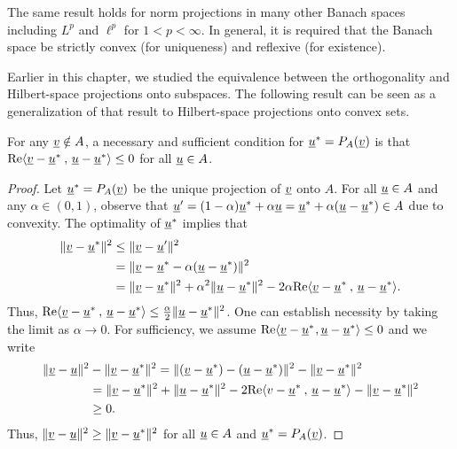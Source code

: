 \begin{remark}
The same result holds for norm projections in many other Banach spaces including $L^{p}$ and $\ell^{p}$ for $1<p<\infty$. In general, it is required that the Banach space be strictly convex (for uniqueness) and reflexive (for existence).
\end{remark}



Earlier in this chapter, we studied the equivalence between the orthogonality and Hilbert-space projections onto subspaces.
The following result can be seen as a generalization of that result to Hilbert-space projections onto convex sets.

\begin{theorem}
\label{theorem:convex_proj_lt0}
For any $\underline{v} \notin A$, a necessary and sufficient condition for $\underline{u}^* = P_A (\underline{v})$ is that $\mathrm{Re} {\langle  \underline{v}-\underline{u}^* \, \mskip1mu , \, \underline{u}-\underline{u}^*  \rangle} \leq 0$ for all $\underline{u}\in A$.
\end{theorem}
\begin{proof}
Let $\underline{u}^* = P_A (\underline{v})$ be the unique projection of $\underline{v}$ onto $A$.
For all $\underline{u} \in A$ %
and any $\alpha\in (0,1)$, observe that $\underline{u}'=(1-\alpha) \underline{u}^* + \alpha \underline{u} = \underline{u}^* + \alpha (\underline{u}-\underline{u}^*)\in A$ due to convexity.
The optimality of $\underline{u}^*$ implies that
\begin{align*}
\| \underline{v}-\underline{u}^* \|^2
&\leq \| \underline{v}- \underline{u}' \|^2 \\
&= \| \underline{v}- \underline{u}^* - \alpha (\underline{u}-\underline{u}^*) \|^2 \\
&= \| \underline{v} - \underline{u}^* \|^2 + \alpha^2 \| \underline{u} - \underline{u}^* \|^2 - 2 \alpha \mathrm{Re} {\langle  \underline{v}-\underline{u}^* \, \mskip1mu , \, \underline{u}-\underline{u}^*  \rangle}. 
\end{align*}
Thus, $\mathrm{Re} {\langle  \underline{v}-\underline{u}^* \, \mskip1mu , \, \underline{u}-\underline{u}^*  \rangle} \leq \frac{\alpha}{2} \| \underline{u} - \underline{u}^* \|^2$.
One can establish necessity by taking the limit as $\alpha \to 0$.
For sufficiency, we assume $\mathrm{Re} {\langle  \underline{v}-\underline{u}^*  \mskip1mu ,  \underline{u}-\underline{u}^*  \rangle} \leq 0$ and we write
\begin{align*}
\| \underline{v}-\underline{u} \|^2 &- \| \underline{v} - \underline{u}^* \|^2
= \| (\underline{v} - \underline{u}^*) - (\underline{u} - \underline{u}^*) \|^2 - \|\underline{v} - \underline{u}^* \|^2 \\
&= \| \underline{v}-\underline{u}^* \|^2 + \| \underline{u} -\underline{u}^* \| ^2 - 2 \mathrm{Re} {\langle  v-\underline{u}^* \, \mskip1mu , \, \underline{u}-\underline{u}^*  \rangle} - \|\underline{v}-\underline{u}^* \|^2 \\
&\geq 0.
\end{align*}
Thus, $\| \underline{v}-\underline{u} \|^2 \geq \| \underline{v} - \underline{u}^* \|^2$ for all $\underline{u} \in A$ and $\underline{u}^* = P_A (\underline{v})$.
\end{proof}

